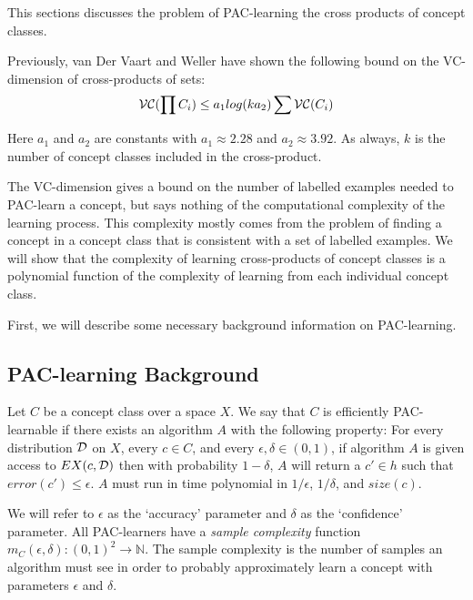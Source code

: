 This sections discusses the problem of PAC-learning the cross products of concept classes. 

Previously, van Der Vaart and Weller \cite{van2009note} have shown the following bound on the VC-dimension of cross-products of sets:
\[\mathcal{V}\mathcal{C}(\prod C_i) \le a_1 log(k a_2) \sum \mathcal{V}\mathcal{C}(C_i)\] 

Here $a_1$ and $a_2$ are constants with $a_1 \approx 2.28$ and $a_2 \approx 3.92$.
As always, $k$ is the number of concept classes included in the cross-product.

The VC-dimension gives a bound on the number of labelled examples needed to PAC-learn a concept, but says nothing of the computational complexity of the learning process. 
This complexity mostly comes from the problem of finding a concept in a concept class that is consistent with a set of labelled examples. 
We will show that the complexity of learning cross-products of concept classes is a polynomial function of the complexity of learning from each individual concept class.

First, we will describe some necessary background information on PAC-learning.

\subsection{PAC-learning Background}






\begin{definition}
Let $C$ be a concept class over a space $X$. 
We say that $C$ is efficiently PAC-learnable if there exists an algorithm $A$ with the following property:
For every distribution $\mathcal{D}$ on $X$, every $c \in C$, and every $\epsilon, \delta \in (0, 1)$,
if algorithm $A$ is given access to $EX(c,\mathcal{D})$ then with probability $1 - \delta$, $A$ will return a $c' \in h$ such that $error(c') \le \epsilon$. 
$A$ must run in time polynomial in $1/\epsilon$, $1/\delta$, and $size(c)$. 
\end{definition}

We will refer to $\epsilon$ as the `accuracy' parameter and $\delta$ as the `confidence' parameter.
All PAC-learners have a \emph{sample complexity} function $m_C(\epsilon, \delta): (0,1)^2 \rightarrow \mathbb{N}$. 
The sample complexity is the number of samples an algorithm must see in order to probably approximately learn a concept with parameters $\epsilon$ and $\delta$.


